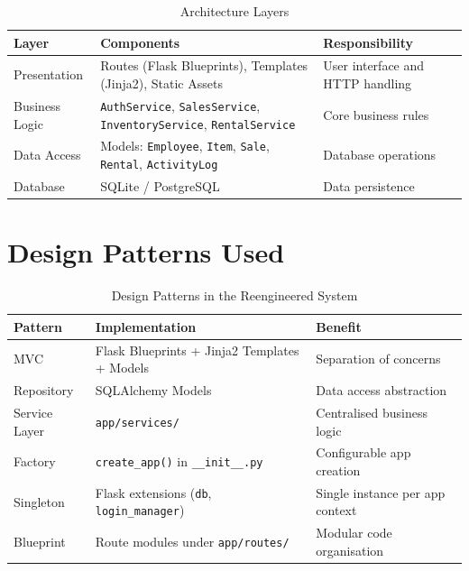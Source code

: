 \begin{table}[h]
  \centering
  \caption{Architecture Layers}
  \begin{tabular}{p{3cm} p{4cm} p{5cm}}
    \toprule
    \textbf{Layer} & \textbf{Components} & \textbf{Responsibility} \\
    \midrule
    Presentation &
      Routes (Flask Blueprints), Templates (Jinja2), Static Assets &
      User interface and HTTP handling \\
    Business Logic &
      \texttt{AuthService}, \texttt{SalesService},
      \texttt{InventoryService}, \texttt{RentalService} &
      Core business rules \\
    Data Access &
      Models: \texttt{Employee}, \texttt{Item}, \texttt{Sale},
      \texttt{Rental}, \texttt{ActivityLog} &
      Database operations \\
    Database &
      SQLite / PostgreSQL &
      Data persistence \\
    \bottomrule
  \end{tabular}
\end{table}

\section{Design Patterns Used}

\begin{table}[h]
  \centering
  \caption{Design Patterns in the Reengineered System}
  \begin{tabular}{p{3cm} p{5cm} p{4cm}}
    \toprule
    \textbf{Pattern} & \textbf{Implementation} & \textbf{Benefit} \\
    \midrule
    MVC &
      Flask Blueprints + Jinja2 Templates + Models &
      Separation of concerns \\
    Repository &
      SQLAlchemy Models &
      Data access abstraction \\
    Service Layer &
      \texttt{app/services/} &
      Centralised business logic \\
    Factory &
      \texttt{create\_app()} in \texttt{\_\_init\_\_.py} &
      Configurable app creation \\
    Singleton &
      Flask extensions (\texttt{db}, \texttt{login\_manager}) &
      Single instance per app context \\
    Blueprint &
      Route modules under \texttt{app/routes/} &
      Modular code organisation \\
    \bottomrule
  \end{tabular}
\end{table}

